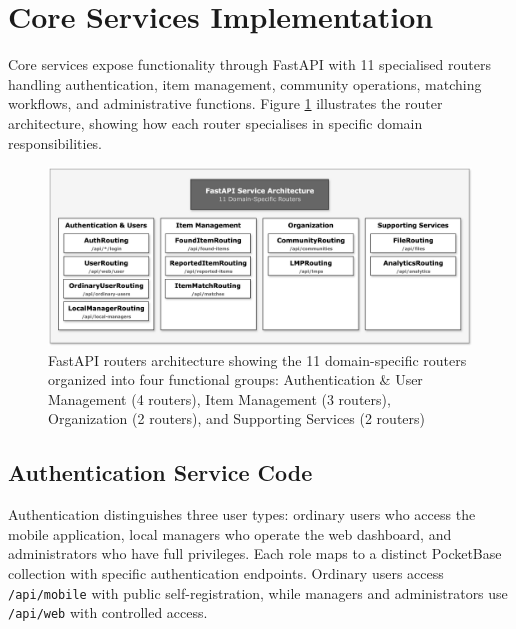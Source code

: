 
\section{Core Services Implementation} \label{section:core_services}

Core services expose functionality through FastAPI with 11 specialised routers handling authentication, item management, community operations, matching workflows, and administrative functions. Figure \ref{fig:fastapi_routers} illustrates the router architecture, showing how each router specialises in specific domain responsibilities.

\begin{figure}[htbp]
    \centering
    \includegraphics[width=\textwidth]{figs/chapter4/fastapi_routers.png}
    \caption[FastAPI Routers Architecture]{FastAPI routers architecture showing the 11 domain-specific routers organized into four functional groups: Authentication \& User Management (4 routers), Item Management (3 routers), Organization (2 routers), and Supporting Services (2 routers)}
    \label{fig:fastapi_routers}
\end{figure}

\subsection{Authentication Service Code} \label{subsection:auth_service}

Authentication distinguishes three user types: ordinary users who access the mobile application, local managers who operate the web dashboard, and administrators who have full privileges. Each role maps to a distinct PocketBase collection with specific authentication endpoints. Ordinary users access \texttt{/api/mobile} with public self-registration, while managers and administrators use \texttt{/api/web} with controlled access.


